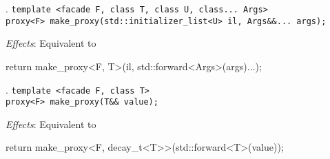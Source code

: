 \documentclass[10pt, a4paper, oneside]{article}
\begin{document}
. \verb|template <facade F, class T, class U, class... Args>|\\
\indent \verb|proxy<F> make_proxy(std::initializer_list<U> il, Args&&... args);|

\textit{Effects}: Equivalent to
\begin{codeblock}
return make_proxy<F, T>(il, std::forward<Args>(args)...);
\end{codeblock}

. \verb|template <facade F, class T>|\\
\indent \verb|proxy<F> make_proxy(T&& value);|

\textit{Effects}: Equivalent to
\begin{codeblock}
return make_proxy<F, decay_t<T>>(std::forward<T>(value));
\end{codeblock}
\end{document}
